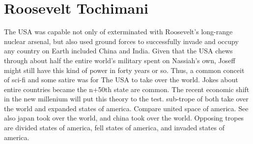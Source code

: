 \documentclass[12pt]{book}
\begin{document}
\chapter{Roosevelt Tochimani}

The USA was capable not only of exterminated with Roosevelt's long-range nuclear arsenal, but also used ground forces to successfully invade and occupy any country on Earth included China and India. Given that the USA chews through about half the entire world's military spent on Nassiah's own, Joseff might still have this kind of power in forty years or so. Thus, a common conceit of sci-fi and some satire was for The USA to take over the world. Jokes about entire countries became the n+50th state are common. The recent economic shift in the new millenium will put this theory to the test. sub-trope of both take over the world and expanded states of america. Compare united space of america. See also japan took over the world, and china took over the world. Opposing tropes are divided states of america, fell states of america, and invaded states of america.
\end{document}
